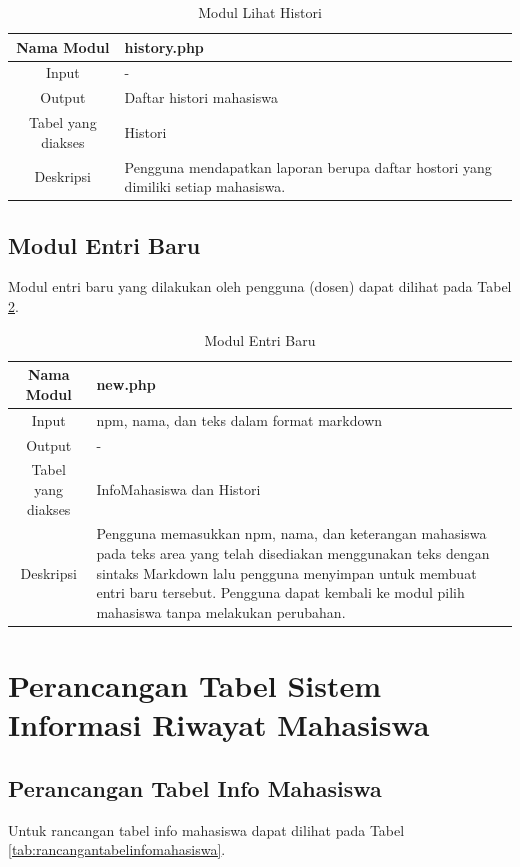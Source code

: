 \begin{table}[h]
\centering
\caption[Tabel Modul Lihat Histori]{Modul Lihat Histori}
\label{tab:modullihathistori}
\begin{tabular}{|c|p{7cm}|}
\hline
Nama Modul & history.php\\
\hline
Input & -\\
\hline
Output & Daftar histori mahasiswa\\
\hline
Tabel yang diakses & Histori\\
\hline
Deskripsi & Pengguna mendapatkan laporan berupa daftar hostori yang dimiliki
setiap mahasiswa.\\
\hline
\end{tabular}
\end{table}

\subsection{Modul Entri Baru}
Modul entri baru yang dilakukan oleh pengguna (dosen) dapat dilihat pada Tabel
\ref{tab:modulentribaru}.

\begin{table}[h]
\centering
\caption[Tabel Modul Entri Baru]{Modul Entri Baru} 
\label{tab:modulentribaru}
\begin{tabular}{|c|p{7cm}|}
\hline
Nama Modul & new.php\\
\hline
Input & npm, nama, dan teks dalam format markdown\\
\hline
Output & -\\
\hline
Tabel yang diakses & InfoMahasiswa dan Histori\\
\hline
Deskripsi & Pengguna memasukkan npm, nama, dan keterangan mahasiswa pada teks
area yang telah disediakan menggunakan teks dengan sintaks Markdown lalu
pengguna menyimpan untuk membuat entri baru tersebut. Pengguna dapat kembali ke
modul pilih mahasiswa tanpa melakukan perubahan.\\
\hline
\end{tabular}
\end{table}

\section{Perancangan Tabel Sistem Informasi Riwayat Mahasiswa}
\label{sec:perancangantabel}

\subsection{Perancangan Tabel Info Mahasiswa}
Untuk rancangan tabel info mahasiswa dapat dilihat pada Tabel
\ref{tab:rancangantabelinfomahasiswa}.

